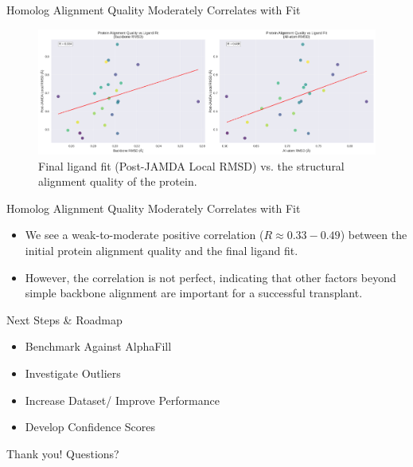 \documentclass[aspectratio=169]{beamer}
\begin{document}
\begin{frame}{Homolog Alignment Quality Moderately Correlates with Fit}
    \begin{figure}
        \includegraphics[width=\textwidth, keepaspectratio]{images/alignment_quality_analysis.png}
        \caption{Final ligand fit (Post-JAMDA Local RMSD) vs. the structural alignment quality of the protein.}
    \end{figure}
\end{frame}
\begin{frame}{Homolog Alignment Quality Moderately Correlates with Fit}
    \begin{itemize}
        \item We see a weak-to-moderate positive correlation ($R \approx 0.33 - 0.49$) between the initial protein alignment quality and the final ligand fit.
        \item However, the correlation is not perfect, indicating that other factors beyond simple backbone alignment are important for a successful transplant.
    \end{itemize}
\end{frame}

\begin{frame}{Next Steps \& Roadmap}
    \begin{itemize}
        \item Benchmark Against AlphaFill
        \item Investigate Outliers
        \item Increase Dataset/ Improve Performance
        \item Develop Confidence Scores
    \end{itemize}
\end{frame}

\begin{frame}
    \centering
    \Huge{Thank you!}
    \vfill
    \Large{Questions?}
\end{frame}
\end{document}
